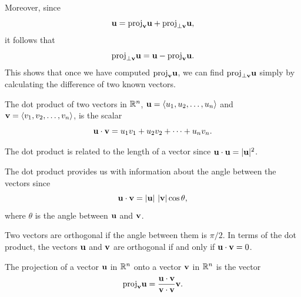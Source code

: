 Moreover, since
\[\mathbf{u} = \text{proj}_{\mathbf{v}} \mathbf{u} + \text{proj}_{\perp \mathbf{v}} \mathbf{u},\]
it follows that
\[\text{proj}_{\perp \mathbf{v}} \mathbf{u} = \mathbf{u} - \text{proj}_{\mathbf{v}} \mathbf{u}.\]
This shows that once we have computed $\text{proj}_{\mathbf{v}} \mathbf{u}$, we can find
$\text{proj}_{\perp \mathbf{v}} \mathbf{u}$ simply by calculating the difference of two
known vectors.




\begin{summary}
\item The dot product of two vectors in $\mathbb{R}^n$, $\mathbf{u} = \langle u_1,
  u_2, \ldots, u_n \rangle$ and $\mathbf{v} = \langle v_1, v_2, \ldots, v_n
  \rangle$, is the scalar
  \[
  \mathbf{u} \cdot \mathbf{v} = u_1v_1 + u_2v_2 + \cdots + u_nv_n.
  \]
\item The dot product is related to the length of a vector since
  $\mathbf{u}\cdot\mathbf{u} = |\mathbf{u}|^2$.
\item The dot product provides us with information about the angle
  between the vectors since 
  \[
  \vu\cdot\vv = |\vu| \ |\vv|\cos\theta,
  \] 
  where $\theta$ is the angle
  between $\mathbf{u}$ and $\mathbf{v}$. 
\item Two vectors are orthogonal if the angle between them
  is $\pi/2$. In terms of the dot product, the vectors $\mathbf{u}$ and
  $\mathbf{v}$ are orthogonal if and only if $\mathbf{u} \cdot \mathbf{v} = 0$.
\item The projection of a vector $\mathbf{u}$ in $\mathbb{R}^n$ onto a vector $\mathbf{v}$
  in $\mathbb{R}^n$ is the vector
  \[
  \text{proj}_{\mathbf{v}} \mathbf{u} = \frac{\mathbf{u} \cdot \mathbf{v}}{\mathbf{v}\cdot\mathbf{v}} \mathbf{v}.
  \]
\end{summary}



\nin \hrulefill



\clearpage
